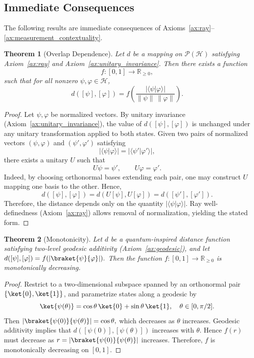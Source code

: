 \documentclass[aps,pra,reprint,nofootinbib,showpacs,superscriptaddress]{revtex4-1}
\newtheorem{theorem}{Theorem}[section]
\newcommand{\Hilbert}{\mathcal{H}}
\newcommand{\Proj}{\mathcal{P}}
\begin{document}
\subsection{Immediate Consequences}
The following results are immediate consequences of Axioms~\ref{ax:ray}--\ref{ax:measurement_contextuality}.
\begin{theorem}[Overlap Dependence]
\label{thm:overlap}
Let $d$ be a mapping on $\Proj(\Hilbert)$ satisfying
Axiom~\ref{ax:ray}
and Axiom~\ref{ax:unitary_invariance}.
Then there exists a function
\[
f : [0,1] \to \mathbb{R}_{\ge 0},
\]
such that for all nonzero $\psi,\varphi \in \Hilbert$,
\[
d([\psi],[\varphi])
=
f\!\left(
\frac{|\langle \psi|\varphi\rangle|}
{\|\psi\|\,\|\varphi\|}
\right).
\]
\end{theorem}
\begin{proof}
Let $\psi,\varphi$ be normalized vectors. 
By unitary invariance (Axiom~\ref{ax:unitary_invariance}), the value of $d([\psi],[\varphi])$
is unchanged under any unitary transformation applied to both states.
Given two pairs of normalized vectors
$(\psi,\varphi)$ and $(\psi',\varphi')$
satisfying
\[
|\langle\psi|\varphi\rangle|
=
|\langle\psi'|\varphi'\rangle|,
\]
there exists a unitary $U$ such that
\[
U\psi=\psi',
\qquad
U\varphi=\varphi'.
\]
Indeed, by choosing orthonormal bases extending each pair,
one may construct $U$ mapping one basis to the other.
Hence,
\[
d([\psi],[\varphi])
=
d(U[\psi],U[\varphi])
=
d([\psi'],[\varphi']).
\]
Therefore, the distance depends only on the quantity
$|\langle\psi|\varphi\rangle|$.
Ray well-definedness (Axiom~\ref{ax:ray}) allows removal of normalization,
yielding the stated form.
\end{proof}

\begin{theorem}[Monotonicity]
\label{thm:monotonicity}
Let $d$ be a quantum-inspired distance function satisfying two-level geodesic additivity (Axiom~\ref{ax:geodesic}), and let 
\(
d([\psi],[\varphi]) = f(|\braket{\psi}{\varphi}|).
\)
Then the function $f:[0,1]\to\mathbb{R}_{\ge 0}$ is monotonically decreasing.
\end{theorem}

\begin{proof}
Restrict to a two-dimensional subspace spanned by an orthonormal pair $\{\ket{0},\ket{1}\}$, 
and parametrize states along a geodesic by
\[
\ket{\psi(\theta)} = \cos\theta\,\ket{0} + \sin\theta\,\ket{1}, 
\quad \theta \in [0,\pi/2].
\]
Then 
\(
|\braket{\psi(0)}{\psi(\theta)}| = \cos\theta,
\)
which decreases as \(\theta\) increases. Geodesic additivity implies that $d([\psi(0)],[\psi(\theta)])$ increases with $\theta$.  
Hence $f(r)$ must decrease as $r = |\braket{\psi(0)}{\psi(\theta)}|$ increases.  
Therefore, $f$ is monotonically decreasing on $[0,1]$.
\end{proof}
\end{document}
